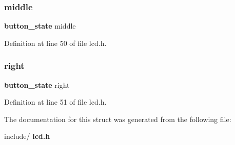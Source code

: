 \mbox{\label{structlcd__buttons_a682104bb266b516795b8533f269e0c74}} 
\subsubsection{middle}
{\footnotesize\ttfamily \textbf{ button\+\_\+state} middle}



Definition at line 50 of file lcd.\+h.

\mbox{\label{structlcd__buttons_adfa688bb1cef42853f6eb2061f726e19}} 
\subsubsection{right}
{\footnotesize\ttfamily \textbf{ button\+\_\+state} right}



Definition at line 51 of file lcd.\+h.



The documentation for this struct was generated from the following file\+:\begin{DoxyCompactItemize}
\item 
include/\textbf{ lcd.\+h}\end{DoxyCompactItemize}
